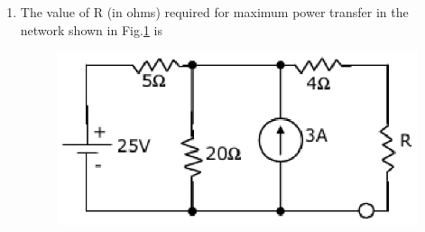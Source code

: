 \documentclass[journal,12pt,twocolumn]{IEEEtran}
\begin{document}
\begin{enumerate}
\item The value of R (in ohms) required for maximum power transfer in the network
shown in Fig.\ref{fig25} is
\begin{enumerate}
\setlength\itemsep{2em}
\begin{figure}[!h]
\begin{center}
\includegraphics[scale=0.5]{./figs/fig25.eps}
\caption{}
\label{fig25}
\end{center}
\end{figure}
\end{enumerate}



\end{enumerate}
\end{document}

